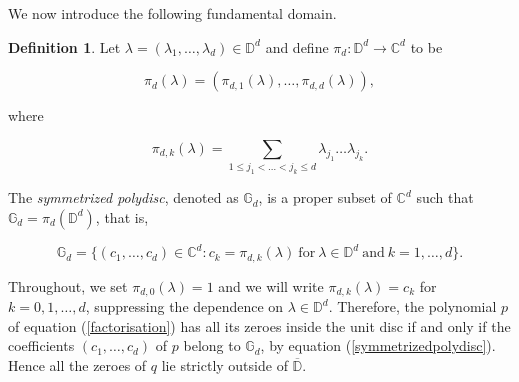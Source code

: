 \documentclass[10pt, reqno]{amsart}
\theoremstyle{definition}
\newtheorem{definition}[theorem]{Definition}
\numberwithin{equation}{section}
\begin{document}

We now introduce the following fundamental domain.

\begin{definition}\label{polydiscdef}
    Let $\lambda=(\lambda_{1},\hdots,\lambda_{d})\in\mathbb{D}^{d}$ and define $\pi_{d} :\mathbb{D}^{d}\rightarrow \mathbb{C}^{d}$ to be
    
    $$\pi_{d}(\lambda)=(\pi_{d,1}(\lambda),\hdots,\pi_{d,d}(\lambda)),$$ 
    
\noindent where

\begin{equation}\label{symmetrizedpolydisc}
\pi_{d,k}(\lambda)=\sum_{1\leq j_{1}<\hdots<j_{k}\leq d} \lambda_{j_{1}}\hdots \lambda_{j_{k}}.
\end{equation}

\noindent The {\it{symmetrized polydisc}}, denoted as $\mathbb{G}_{d}$, is a proper subset of $ \mathbb{C}^{d}$ such that $\mathbb{G}_{d}=\pi_{d}(\mathbb{D}^{d})$, that is, 

$$\mathbb{G}_{d}=\bigg\{(c_{1},\hdots,c_{d})\in\mathbb{C}^{d}: c_{k}=\pi_{d,k}(\lambda)~\text{for}~\lambda\in\mathbb{D}^{d}~\text{and}~k=1,\hdots,d\bigg\}.$$

\end{definition}

\noindent Throughout, we set $\pi_{d,0}(\lambda)=1$ and we will write $\pi_{d,k}(\lambda)=c_{k}$ for $k=0,1,\hdots,d$, suppressing the dependence on $\lambda\in\mathbb{D}^{d}$. Therefore, the polynomial $p$ of equation (\ref{factorisation}) has all its zeroes inside the unit disc if and only if the coefficients $(c_{1},\hdots,c_{d})$ of $p$ belong to $\mathbb{G}_{d}$, by equation (\ref{symmetrizedpolydisc}). Hence all the zeroes of $q$ lie strictly outside of $\overline{\mathbb{D}}$. 
\end{document}
